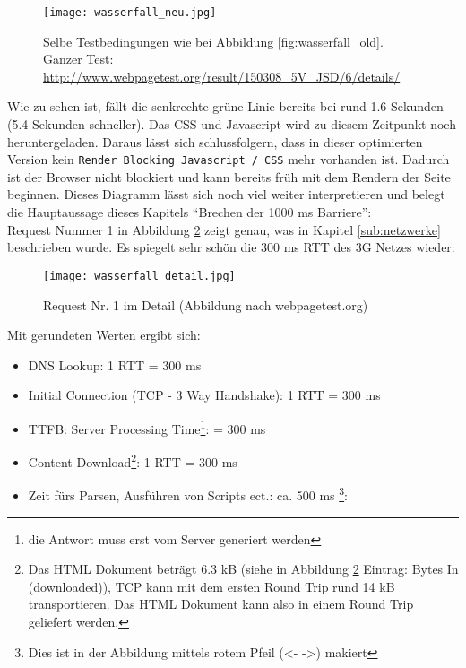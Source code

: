 	  \begin{figure}[htbp]
	  	\begin{center}
	  		\texttt{[image: wasserfall\_neu.jpg]}
	  		\caption{Selbe Testbedingungen wie bei Abbildung \ref{fig:wasserfall_old}. Ganzer Test: \url{http://www.webpagetest.org/result/150308_5V_JSD/6/details/}}
	  		\label{fig:wasserfall_neu}
	  	\end{center}
	  \end{figure}
	  Wie zu sehen ist, fällt die senkrechte grüne Linie bereits bei rund 1.6 Sekunden (5.4 Sekunden schneller). Das CSS und Javascript wird zu diesem Zeitpunkt noch heruntergeladen. Daraus lässt sich schlussfolgern, dass in dieser optimierten Version kein \texttt{Render Blocking Javascript / CSS} mehr vorhanden ist. Dadurch ist der Browser nicht blockiert und kann bereits früh mit dem Rendern der Seite beginnen. Dieses Diagramm lässt sich noch viel weiter interpretieren und belegt die Hauptaussage dieses Kapitels "`Brechen der 1000 ms Barriere"':\\
	  Request Nummer 1 in Abbildung \ref{fig:wasserfall_detail} zeigt genau, was in Kapitel \ref{sub:netzwerke} beschrieben wurde. Es spiegelt sehr schön die 300 ms RTT des 3G Netzes wieder:
	  
	  \begin{figure}[htbp]
	  	\begin{center}
	  		\texttt{[image: wasserfall\_detail.jpg]}
	  		\caption{Request Nr. 1 im Detail (Abbildung nach webpagetest.org)}
	  		\label{fig:wasserfall_detail}
	  	\end{center}
	  \end{figure} 
	  
	  Mit gerundeten Werten ergibt sich:

	  \begin{itemize}
	  	\item DNS Lookup: 1 RTT = 300 ms
	  	\item Initial Connection (TCP - 3 Way Handshake): 1 RTT = 300 ms
	  	\item TTFB: Server Processing Time\footnote{die Antwort muss erst vom Server generiert werden}: = 300 ms
	  	\item Content Download\footnote{Das HTML Dokument beträgt 6.3 kB (siehe in Abbildung \ref{fig:wasserfall_detail} Eintrag: Bytes In (downloaded)), TCP kann mit dem ersten Round Trip rund 14 kB transportieren. Das HTML Dokument kann also in einem Round Trip geliefert werden.}: 1 RTT = 300 ms 
	  	\item Zeit fürs Parsen, Ausführen von Scripts ect.: ca. 500 ms \footnote{Dies ist in der Abbildung mittels rotem Pfeil (<- ->) makiert}:  
	  \end{itemize}
 
